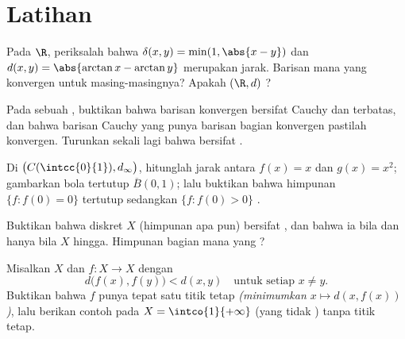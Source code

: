 \section{Latihan}

\begin{exercise}[$\star$]\label{exo:b2:metric:1}
Pada $\R$, periksalah bahwa $\delta(x, y) = \min(1, \abs{x - y})$ dan
$d(x,y) = \abs{\arctan x - \arctan y}$ merupakan jarak. Barisan mana yang
konvergen untuk masing-masingnya? Apakah $(\R, d)$ ?
\end{exercise}

\begin{exercise}[$\star$]\label{exo:b2:metric:2}
Pada sebuah , buktikan bahwa barisan konvergen bersifat
Cauchy dan terbatas, dan bahwa barisan Cauchy yang punya barisan bagian
konvergen pastilah konvergen. Turunkan sekali lagi bahwa  bersifat .
\end{exercise}

\begin{exercise}[$\star$]\label{exo:b2:metric:3}
Di $\bigl(C(\intcc{0}{1}), d_\infty\bigr)$, hitunglah jarak
antara $f(x) = x$ dan $g(x) = x^2$; gambarkan bola tertutup
$\overline B(0, 1)$; lalu buktikan bahwa himpunan $\{f : f(0) = 0\}$
tertutup sedangkan $\{f : f(0) > 0\}$ .
\end{exercise}

\begin{exercise}[$\star\star$]\label{exo:b2:metric:4}
Buktikan bahwa  diskret $X$ (himpunan apa pun) bersifat
, dan bahwa ia  bila dan hanya bila $X$ hingga. Himpunan
bagian mana yang ?
\end{exercise}

\begin{exercise}[$\star\star$]\label{exo:b2:metric:5}
Misalkan $X$  dan $f \colon X \to X$ dengan
\[
d\bigl(f(x), f(y)\bigr) < d(x, y) \quad \text{untuk setiap } x \neq y .
\]
Buktikan bahwa $f$ punya tepat satu titik tetap \emph{(minimumkan $x
\mapsto d(x, f(x))$)}, lalu berikan contoh pada $X = \intco{1}{+\infty}$
(yang tidak ) tanpa titik tetap.
\end{exercise}

